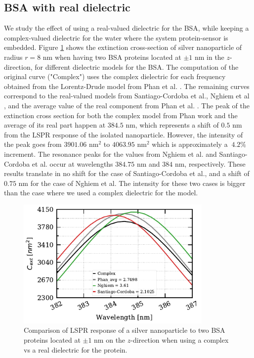 \subsection{BSA with real dielectric}

We study the effect of using a real-valued dielectric for the BSA, while keeping a complex-valued dielectric for the water where  
the system protein-sensor is embedded. Figure \ref{fig:bsa_diel} shows the extinction cross-section of silver nanoparticle 
of radius $r=8$ nm when having two BSA proteins located at $\pm1$ nm in the $z$-direction, for different dielectric models for the BSA. 
The computation of the original curve ("Complex") uses the complex dielectric for each frequency obtained from the Lorentz-Drude model 
from Phan et al. \cite{PhanETal2013}. The remaining curves correspond to the real-valued models from Santiago-Cordoba et al.\cite{SantiagoCordobaETal2011},
Nghiem et al \cite{NghiemETal2012}, and the average value of the real component from Phan et al. \cite{PhanETal2013}. The peak of the extinction cross section 
for both the complex model from Phan work \cite{PhanETal2013} and the average of its real part happen at $384.5$ nm, which represents a shift of $0.5$ nm from 
the LSPR response of the isolated nanoparticle. However, the intensity of the peak goes from $3901.06$ nm$^2$ to $4063.95$ nm$^2$ which is approximately a $~4.2\%$ increment. 
The resonance peaks for the values from Nghiem et al. and Santiago-Cordoba et al. occur at wavelengths $384.75$ nm and $384$ nm, respectively. These results 
translate in no shift for the case of Santiago-Cordoba et al., and a shift of $0.75$ nm for the case of Nghiem et al. The intensity for these two cases is 
bigger than the case where we used a complex dielectric for the model. 

\begin{figure} %
    \centering
    \includegraphics[width=0.85\textwidth]{bsa_diel_study.pdf} 
    \caption{Comparison of LSPR response of a silver nanoparticle to two BSA proteins located at $\pm1$ nm on the $z$-direction
    when using a complex vs a real dielectric for the protein.}
    \label{fig:bsa_diel}
 \end{figure}

